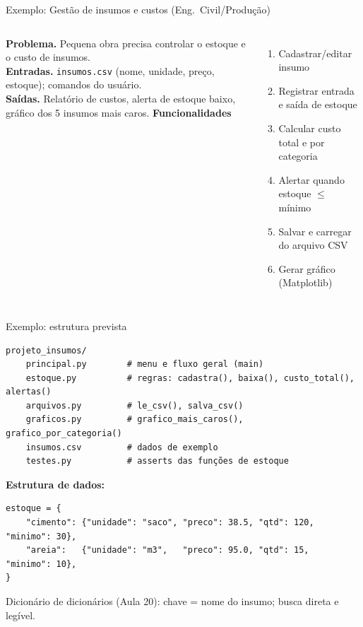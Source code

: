 \documentclass[aspectratio=169,10pt,t]{beamer}
\begin{document}
\begin{frame}{Exemplo: Gestão de insumos e custos (Eng.\ Civil/Produção)}
  \small
  \begin{columns}[T]
    \textbf{Problema.} Pequena obra precisa controlar o estoque e o custo de insumos.\\[1ex]
    \textbf{Entradas.} \texttt{insumos.csv} (nome, unidade, preço, estoque); comandos do usuário.\\[1ex]
    \textbf{Saídas.} Relatório de custos, alerta de estoque baixo, gráfico dos 5 insumos mais caros.
    \textbf{Funcionalidades}
    \begin{enumerate}
      \item Cadastrar/editar insumo
      \item Registrar entrada e saída de estoque
      \item Calcular custo total e por categoria
      \item Alertar quando estoque \(\le\) mínimo
      \item Salvar e carregar do arquivo CSV
      \item Gerar gráfico (Matplotlib)
    \end{enumerate}
  \end{columns}
\end{frame}

\begin{frame}[fragile]{Exemplo: estrutura prevista}
\begin{lstlisting}[basicstyle=\ttfamily\scriptsize]
projeto_insumos/
    principal.py        # menu e fluxo geral (main)
    estoque.py          # regras: cadastra(), baixa(), custo_total(), alertas()
    arquivos.py         # le_csv(), salva_csv()
    graficos.py         # grafico_mais_caros(), grafico_por_categoria()
    insumos.csv         # dados de exemplo
    testes.py           # asserts das funções de estoque
\end{lstlisting}
  \textbf{Estrutura de dados:}
\begin{lstlisting}[basicstyle=\ttfamily\scriptsize]
estoque = {
    "cimento": {"unidade": "saco", "preco": 38.5, "qtd": 120, "minimo": 30},
    "areia":   {"unidade": "m3",   "preco": 95.0, "qtd": 15,  "minimo": 10},
}
\end{lstlisting}
  \small Dicionário de dicionários (Aula 20): chave = nome do insumo; busca direta e legível.
\end{frame}
\end{document}
